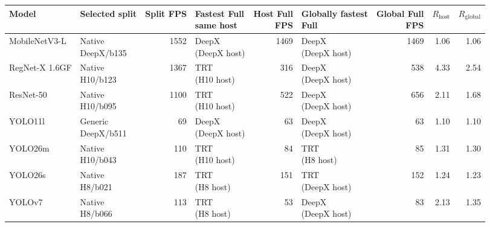 \begin{tabular}{l l r l r l r r r}
\toprule
Model & Selected split & Split FPS & \shortstack{Fastest Full\\same host} & \shortstack{Host Full\\FPS} & \shortstack{Globally fastest\\Full} & \shortstack{Global Full\\FPS} & $R_{\mathrm{host}}$ & $R_{\mathrm{global}}$ \\
\midrule
MobileNetV3-L & \shortstack[l]{Native\\DeepX/b135} & 1552 & \shortstack[l]{DeepX\\(DeepX host)} & 1469 & \shortstack[l]{DeepX\\(DeepX host)} & 1469 & 1.06 & 1.06 \\
RegNet-X 1.6GF & \shortstack[l]{Native\\H10/b123} & 1367 & \shortstack[l]{TRT\\(H10 host)} & 316 & \shortstack[l]{DeepX\\(DeepX host)} & 538 & 4.33 & 2.54 \\
ResNet-50 & \shortstack[l]{Native\\H10/b095} & 1100 & \shortstack[l]{TRT\\(H10 host)} & 522 & \shortstack[l]{DeepX\\(DeepX host)} & 656 & 2.11 & 1.68 \\
YOLO11l & \shortstack[l]{Generic\\DeepX/b511} & 69 & \shortstack[l]{DeepX\\(DeepX host)} & 63 & \shortstack[l]{DeepX\\(DeepX host)} & 63 & 1.10 & 1.10 \\
YOLO26m & \shortstack[l]{Native\\H10/b043} & 110 & \shortstack[l]{TRT\\(H10 host)} & 84 & \shortstack[l]{TRT\\(H8 host)} & 85 & 1.31 & 1.30 \\
YOLO26s & \shortstack[l]{Native\\H8/b021} & 187 & \shortstack[l]{TRT\\(H8 host)} & 151 & \shortstack[l]{TRT\\(DeepX host)} & 152 & 1.24 & 1.23 \\
YOLOv7 & \shortstack[l]{Native\\H8/b066} & 113 & \shortstack[l]{TRT\\(H8 host)} & 53 & \shortstack[l]{DeepX\\(DeepX host)} & 83 & 2.13 & 1.35 \\
\bottomrule
\end{tabular}
\endgroup

